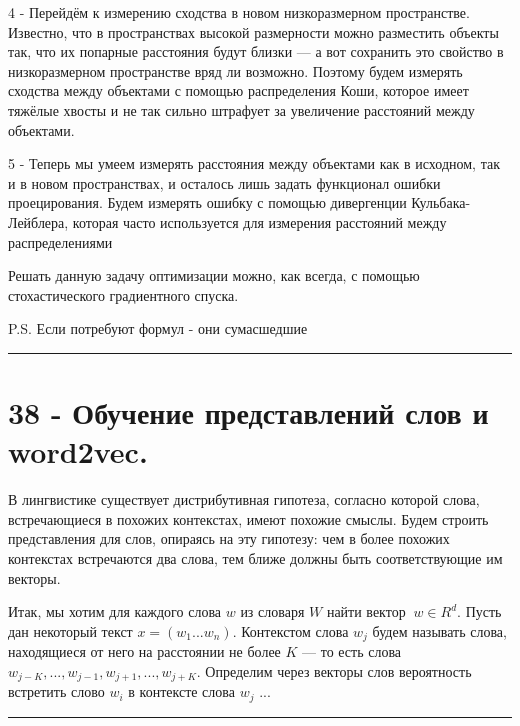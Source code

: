 \documentclass[11pt]{article}
\begin{document}
4 - Перейдём к измерению сходства в новом низкоразмерном пространстве.
Известно, что в пространствах высокой размерности можно разместить
объекты так, что их попарные расстояния будут близки --- а вот сохранить
это свойство в низкоразмерном пространстве вряд ли возможно. Поэтому
будем измерять сходства между объектами с помощью распределения Коши,
которое имеет тяжёлые хвосты и не так сильно штрафует за увеличение
расстояний между объектами.

5 - Теперь мы умеем измерять расстояния между объектами как в исходном,
так и в новом пространствах, и осталось лишь задать функционал ошибки
проецирования. Будем измерять ошибку с помощью дивергенции
Кульбака-Лейблера, которая часто используется для измерения расстояний
между распределениями

Решать данную задачу оптимизации можно, как всегда, с помощью
стохастического градиентного спуска.

P.S. Если потребуют формул - они сумасшедшие

    \begin{center}\rule{0.5\linewidth}{\linethickness}\end{center}

    \section{38 - Обучение представлений слов и
word2vec.}\label{ux43eux431ux443ux447ux435ux43dux438ux435-ux43fux440ux435ux434ux441ux442ux430ux432ux43bux435ux43dux438ux439-ux441ux43bux43eux432-ux438-word2vec.}

В лингвистике существует дистрибутивная гипотеза, согласно которой
слова, встречающиеся в похожих контекстах, имеют похожие смыслы. Будем
строить представления для слов, опираясь на эту гипотезу: чем в более
похожих контекстах встречаются два слова, тем ближе должны быть
соответствующие им векторы.

Итак, мы хотим для каждого слова \(w\) из словаря \(W\) найти вектор
\(~w ∈ R^d\). Пусть дан некоторый текст \(x = (w_1...w_n)\). Контекстом
слова \(w_j\) будем называть слова, находящиеся от него на расстоянии не
более \(K\) --- то есть слова
\(w_{j−K},...,w_{j−1}, w_{j+1},...,w_{j+K}\). Определим через векторы
слов вероятность встретить слово \(w_i\) в контексте слова \(w_j\) ...

    \begin{center}\rule{0.5\linewidth}{\linethickness}\end{center}
\end{document}
